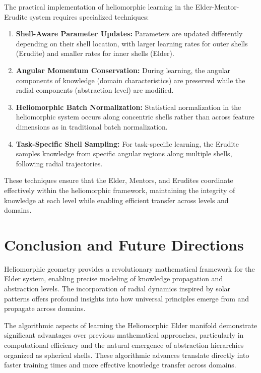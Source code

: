The practical implementation of heliomorphic learning in the Elder-Mentor-Erudite system requires specialized techniques:

\begin{enumerate}
    \item \textbf{Shell-Aware Parameter Updates:} Parameters are updated differently depending on their shell location, with larger learning rates for outer shells (Erudite) and smaller rates for inner shells (Elder).
    
    \item \textbf{Angular Momentum Conservation:} During learning, the angular components of knowledge (domain characteristics) are preserved while the radial components (abstraction level) are modified.
    
    \item \textbf{Heliomorphic Batch Normalization:} Statistical normalization in the heliomorphic system occurs along concentric shells rather than across feature dimensions as in traditional batch normalization.
    
    \item \textbf{Task-Specific Shell Sampling:} For task-specific learning, the Erudite samples knowledge from specific angular regions along multiple shells, following radial trajectories.
\end{enumerate}

These techniques ensure that the Elder, Mentors, and Erudites coordinate effectively within the heliomorphic framework, maintaining the integrity of knowledge at each level while enabling efficient transfer across levels and domains.

\section{Conclusion and Future Directions}

Heliomorphic geometry provides a revolutionary mathematical framework for the Elder system, enabling precise modeling of knowledge propagation and abstraction levels. The incorporation of radial dynamics inspired by solar patterns offers profound insights into how universal principles emerge from and propagate across domains.

The algorithmic aspects of learning the Heliomorphic Elder manifold demonstrate significant advantages over previous mathematical approaches, particularly in computational efficiency and the natural emergence of abstraction hierarchies organized as spherical shells. These algorithmic advances translate directly into faster training times and more effective knowledge transfer across domains.

